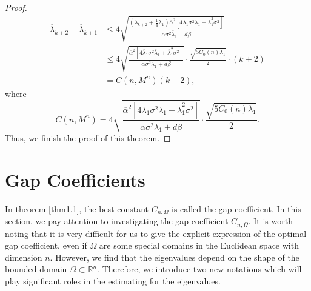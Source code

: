 \documentclass[12pt]{article}
\numberwithin{equation}{section}
\begin{document}
\begin{proof}
\begin{equation}\begin{aligned}\overline{\lambda}_{k+2}-\overline{\lambda}_{k+1}&
\leq4\sqrt{\frac{\left(\overline{\lambda}_{k+2}+\frac{1}{4}\overline{\lambda}_{1}\right)\overline{\alpha}^{2}\left[4\overline{\lambda}_{1}\sigma^{2}\overline{\lambda}_{1} +\overline{\lambda}^{2}_{1}
\sigma^{2}\right]}{\alpha\sigma^{2}\overline{\lambda}_{1}+d\beta}}\\&
\leq4\sqrt{\frac{\overline{\alpha}^{2}\left[4\overline{\lambda}_{1}\sigma^{2}\overline{\lambda}_{1} +\overline{\lambda}^{2}_{1}
\sigma^{2}\right]}{\alpha\sigma^{2}\overline{\lambda}_{1}+d\beta}}\cdot\frac{\sqrt{5C_{0}(n)\overline{\lambda}_{1}}}{2}\cdot(k+2)\\&=
C(n,M^{n})(k+2),
\end{aligned}\end{equation}where $$C(n,M^{n})=4\sqrt{\frac{\overline{\alpha}^{2}\left[4\overline{\lambda}_{1}\sigma^{2}\overline{\lambda}_{1} +\overline{\lambda}^{2}_{1}
\sigma^{2}\right]}{\alpha\sigma^{2}\overline{\lambda}_{1}+d\beta}}\cdot\frac{\sqrt{5C_{0}(n)\overline{\lambda}_{1}}}{2}.$$
Thus, we finish the proof of this theorem.
\end{proof}


\section{Gap Coefficients}\label{sec7}
In theorem \ref{thm1.1}, the best constant $C_{n,\Omega}$ is called the gap coefficient. In this section,
we pay  attention to investigating the gap coefficient $C_{n,\Omega}$. It is worth noting
that it is very difficult for us to give the explicit expression of the optimal gap coefficient, even if $\Omega$ are some special domains in
the Euclidean space with  dimension $n$. However, we find that the eigenvalues depend on the shape of the bounded
domain $\Omega\subset\mathbb{R}^{n}$. Therefore, we introduce two new notations which will play significant roles in the estimating for the eigenvalues.
\end{document}
